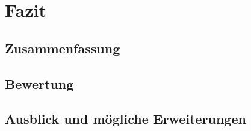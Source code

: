 \chapter{Fazit}
\label{fazit}


\section{Zusammenfassung}
\label{zusammenfassung}


\section{Bewertung}
\label{bewertung}


\section{Ausblick und mögliche Erweiterungen}
\label{ausblick_und_mögliche_erweiterungen}

